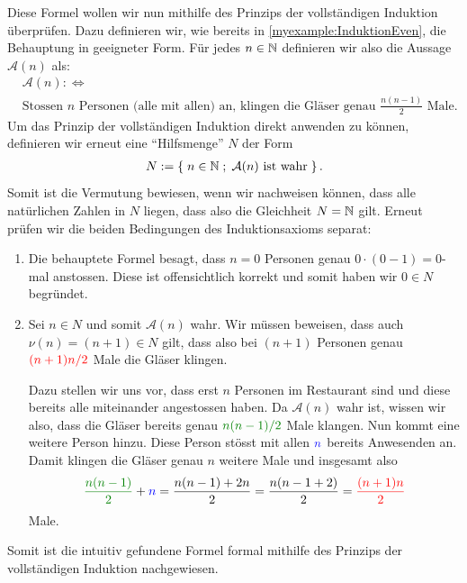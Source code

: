 \begin{myexample}\label{myexample:InduktionGlases}
Diese Formel wollen wir nun mithilfe des Prinzips der vollständigen Induktion überprüfen. Dazu definieren wir, wie bereits in \cref{myexample:InduktionEven}, die Behauptung in geeigneter Form. Für jedes $n\in\mathbb{N}$ definieren wir also die Aussage $\mathcal{A}(n)$ als:
\begin{align*}
	 & \mathcal{A}(n) :\iff                                                                                     \\
	 & \text{Stossen $n$ Personen (alle mit allen) an, klingen die Gläser genau } \frac{n(n-1)}{2}\text{ Male}.
\end{align*}
Um das Prinzip der vollständigen Induktion direkt anwenden zu können, definieren wir erneut eine \enquote{Hilfsmenge} $N$ der Form
\begin{align*}
	N := \left\{\;n\in\mathbb{N} \; ; \; \text{$\mathcal{A}(n)$ ist wahr} \;\right\}.
\end{align*}
Somit ist die Vermutung bewiesen, wenn wir nachweisen können, dass alle natürlichen Zahlen in $N$ liegen, dass also die Gleichheit $N=\mathbb{N}$ gilt. Erneut prüfen wir die beiden Bedingungen des Induktionsaxioms separat:
\begin{enumerate}
	\item Die behauptete Formel besagt, dass $n = 0$ Personen genau $0\cdot (0-1) = 0$-mal anstossen. Diese ist offensichtlich korrekt und somit haben wir $0\in N$ begründet. \checkmark
	\item Sei $n\in N$ und somit $\mathcal{A}(n)$ wahr. Wir müssen beweisen, dass auch $\nu(n)=(n+1)\in N$ gilt, dass also bei $(n+1)$ Personen genau $\textcolor{Red}{(n+1)n/2}$ Male die Gläser klingen.

	      \noindent
	      Dazu stellen wir uns vor, dass erst $n$ Personen im Restaurant sind und diese bereits alle miteinander angestossen haben. Da $\mathcal{A}(n)$ wahr ist, wissen wir also, dass die Gläser bereits genau $\textcolor{Green}{n(n-1)/2}$ Male klangen. Nun kommt eine weitere Person hinzu. Diese Person stösst mit allen $\textcolor{Blue}{n}$ bereits Anwesenden an. Damit klingen die Gläser genau $n$ weitere Male und insgesamt also
	      \begin{align*}
		      \textcolor{Green}{\frac{n(n-1)}{2}} + \textcolor{Blue}{n} = \frac{n(n-1)+2n}{2} = \frac{n(n-1+2)}{2} = \textcolor{Red}{\frac{(n+1)n}{2}}
	      \end{align*}
	      Male. \checkmark
\end{enumerate}
Somit ist die intuitiv gefundene Formel formal mithilfe des Prinzips der vollständigen Induktion nachgewiesen.
\end{myexample}

